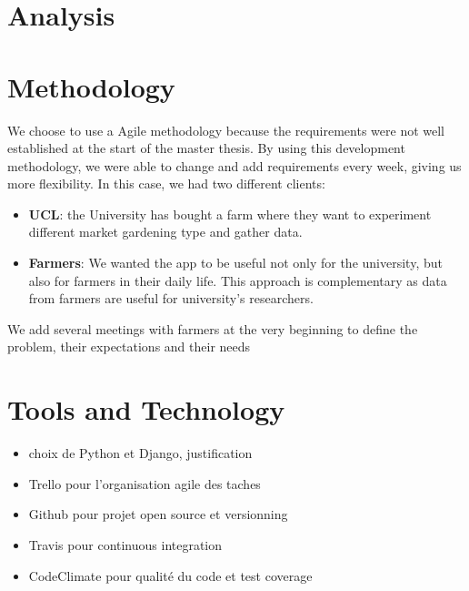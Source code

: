 \section{Analysis}



\section{Methodology}

We choose to use a Agile methodology because the requirements were not well established at the start of the master thesis. By using this development methodology, we were able to change and add requirements every week, giving us more flexibility. In this case, we had two different clients:
\begin{itemize}
    \item \textbf{UCL}: the University has bought a farm where they want to experiment different market gardening type and gather data. 
    \item \textbf{Farmers}: We wanted the app to be useful not only for the university, but also for farmers in their daily life. This approach is complementary as data from farmers are useful for university's researchers.
\end{itemize}
We add several meetings with farmers at the very beginning to define the problem, their expectations and their needs


\section{Tools and Technology}

\begin{itemize}
    \item choix de Python et Django, justification
    \item Trello pour l'organisation agile des taches
    \item Github pour projet open source et versionning
    \item Travis pour continuous integration
    \item CodeClimate pour qualité du code et test coverage
\end{itemize}

